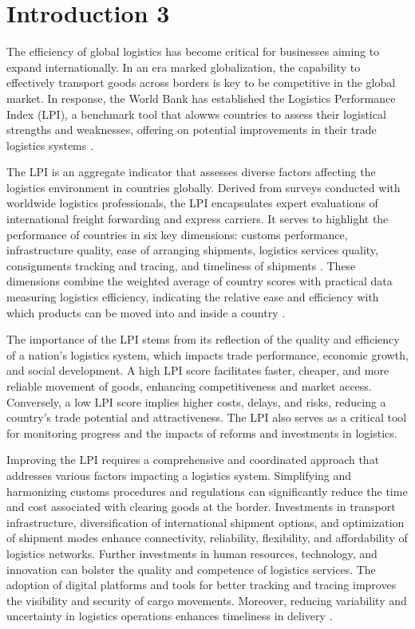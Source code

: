 \documentclass[sigconf]{acmart}
\begin{document}
\section{Introduction 3}
The efficiency of global logistics has become critical for businesses aiming to expand internationally. In an era marked globalization, the capability to effectively transport goods across borders is key to be competitive in the global market. In response, the World Bank has established the Logistics Performance Index (LPI), a benchmark tool that alowws countries to assess their logistical strengths and weaknesses, offering on potential improvements in their trade logistics systems \cite{WBreport2018}.


The LPI is an aggregate indicator that assesses diverse factors affecting the logistics environment in countries globally. Derived from surveys conducted with worldwide logistics professionals, the LPI encapsulates expert evaluations of international freight forwarding and express carriers. It serves to highlight the performance of countries in six key dimensions: customs performance, infrastructure quality, ease of arranging shipments, logistics services quality, consignments tracking and tracing, and timeliness of shipments \cite{WBreport2018}. These dimensions combine the weighted average of country scores with practical data measuring logistics efficiency, indicating the relative ease and efficiency with which products can be moved into and inside a country \cite{WBreport2018}.

The importance of the LPI stems from its reflection of the quality and efficiency of a nation's logistics system, which impacts trade performance, economic growth, and social development. A high LPI score facilitates faster, cheaper, and more reliable movement of goods, enhancing competitiveness and market access. Conversely, a low LPI score implies higher costs, delays, and risks, reducing a country's trade potential and attractiveness. The LPI also serves as a critical tool for monitoring progress and the impacts of reforms and investments in logistics.

Improving the LPI requires a comprehensive and coordinated approach that addresses various factors impacting a logistics system. Simplifying and harmonizing customs procedures and regulations can significantly reduce the time and cost associated with clearing goods at the border. Investments in transport infrastructure, diversification of international shipment options, and optimization of shipment modes enhance connectivity, reliability, flexibility, and affordability of logistics networks. Further investments in human resources, technology, and innovation can bolster the quality and competence of logistics services. The adoption of digital platforms and tools for better tracking and tracing improves the visibility and security of cargo movements. Moreover, reducing variability and uncertainty in logistics operations enhances timeliness in delivery \cite{WBreport2018}.
\end{document}

